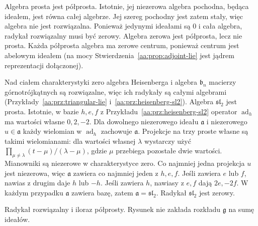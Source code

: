 Algebra prosta jest półprosta. Istotnie, jej niezerowa
algebra pochodna, będąca ideałem, jest równa całej
algebrze. Jej szereg pochodny jest zatem stały,
więc algebra nie jest rozwiązalna. Ponieważ jedynymi
ideałami są $0$ i cała algebra, radykał rozwiązalny
musi być zerowy. Algebra zerowa jest półprosta,
lecz nie prosta. Każda półprosta algebra ma zerowe
centrum, ponieważ centrum jest abelowym ideałem
(na mocy Stwierdzenia~\ref{aa:prop:adjoint-lie} jest
jądrem reprezentacji dołączonej).

\begin{przyklad}
\label{aa:prz:lie-radical-examples}
Nad ciałem charakterystyki zero algebra Heisenberga
i algebra $\mathfrak b_n$ macierzy górnotrójkątnych
są rozwiązalne, więc ich radykały są całymi algebrami
(Przykłady~\ref{aa:prz:triangular-lie}
i~\ref{aa:prz:heisenberg-sl2}).
Algebra $\mathfrak{sl}_2$ jest prosta. Istotnie,
w bazie $h,e,f$ z Przykładu~\ref{aa:prz:heisenberg-sl2}
operator $\operatorname{ad}_h$ ma wartości własne
$0,2,-2$. Dla dowolnego niezerowego ideału
$\mathfrak a$ i niezerowego $u\in\mathfrak a$
każdy wielomian w $\operatorname{ad}_h$ zachowuje
$\mathfrak a$. Projekcje na trzy proste własne
są takimi wielomianami: dla wartości własnej $\lambda$
wystarczy użyć $\prod_{\mu\ne\lambda}
(t-\mu)/(\lambda-\mu)$, gdzie $\mu$ przebiega
pozostałe dwie wartości. Mianowniki są niezerowe
w charakterystyce zero. Co najmniej jedna projekcja
$u$ jest niezerowa, więc $\mathfrak a$ zawiera
co najmniej jeden z $h,e,f$. Jeśli zawiera $e$ lub $f$,
nawias z drugim daje $h$ lub $-h$. Jeśli zawiera $h$,
nawiasy z $e,f$ dają $2e,-2f$. W każdym przypadku
$\mathfrak a$ zawiera bazę, zatem $\mathfrak a=
\mathfrak{sl}_2$. Radykał $\mathfrak{sl}_2$ jest zerowy.
\end{przyklad}

\begin{center}

\small Radykał rozwiązalny i iloraz półprosty.
Rysunek nie zakłada rozkładu $\mathfrak g$ na sumę ideałów.
\end{center}

